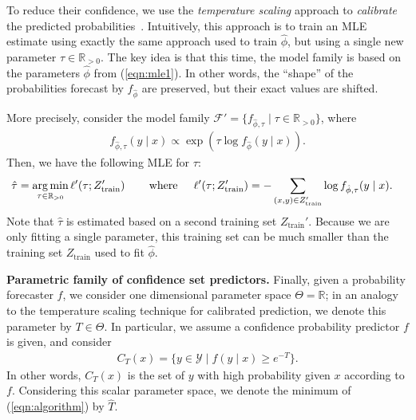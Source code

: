 \documentclass{article} \usepackage{iclr2020_conference,times}
\renewcommand{\(}						{\left(}
\renewcommand{\)}						{\right)}
\renewcommand{\[}						{\left[}
\renewcommand{\]}						{\right]}
\newcommand{\<}						{\left<}
\renewcommand{\>}						{\right>}
\begin{document}
To reduce their confidence, we use the \emph{temperature scaling} approach to \emph{calibrate} the predicted probabilities~\citep{platt1999probabilistic,guo2017calibration}. Intuitively, this approach is to train an MLE estimate using exactly the same approach used to train $\hat{\phi}$, but using a single new parameter $\tau\in\mathbb{R}_{>0}$. The key idea is that this time, the model family is based on the parameters $\hat{\phi}$ from (\ref{eqn:mle1}). In other words, the ``shape'' of the probabilities forecast by $f_{\hat{\phi}}$ are preserved, but their exact values are shifted.

More precisely, consider the model family $\mathcal{F}'=\{f_{\hat{\phi},\tau}\mid\tau\in\mathbb{R}_{>0}\}$, where
\begin{align*}
f_{\hat{\phi},\tau}(y\mid x)\propto\exp\left(\tau\log f_{\hat{\phi}}(y\mid x)\right).
\end{align*}
Then, we have the following MLE for $\tau$:
\begin{align}
\label{eqn:mle2}
\hat{\tau}&=\operatorname*{\arg\min}_{\tau\in\mathbb{R}_{>0}}\ell'(\tau;Z_{\text{train}}')
\hspace{0.3in}\text{where}\hspace{0.2in}
\ell'(\tau;Z_{\text{train}}')=-\sum_{(x,y)\in Z_{\text{train}}'}\log f_{\hat{\phi},\tau}(y\mid x).
\end{align}
Note that $\hat{\tau}$ is estimated based on a second training set $Z_{\text{train}}'$. Because we are only fitting a single parameter, this training set can be much smaller than the training set $Z_{\text{train}}$ used to fit $\hat{\phi}$.

\textbf{Parametric family of confidence set predictors.}
Finally, given a probability forecaster $f$, we consider one dimensional parameter space $\Theta=\mathbb{R}$; in an analogy to the temperature scaling technique for calibrated prediction, we denote this parameter by $T\in\Theta$. In particular, we assume a confidence probability predictor $f$ is given, and consider
\begin{align*}
C_T(x)=
\{y\in\mathcal{Y}\mid f(y\mid x)\ge e^{-T}\}.
\end{align*}
In other words, $C_T(x)$ is the set of $y$ with high probability given $x$ according to $f$.
Considering this scalar parameter space, we denote the minimum of (\ref{eqn:algorithm}) by $\hat{T}$.
\end{document}
